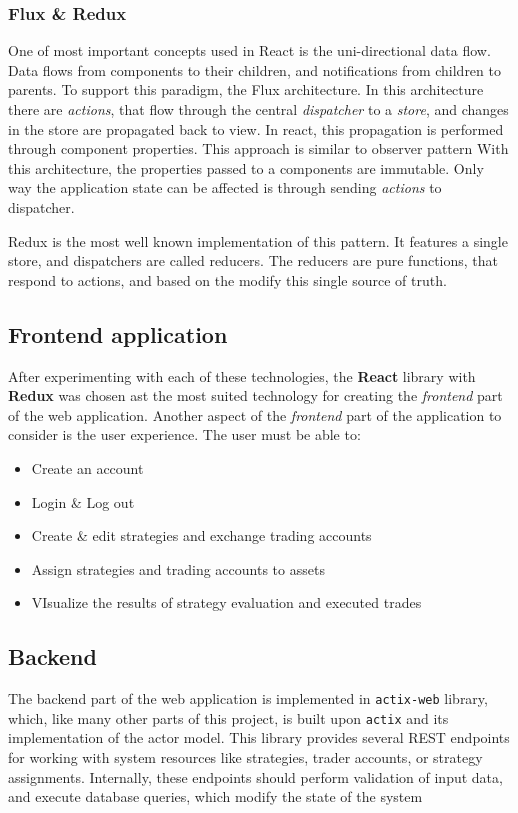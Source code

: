 \subsubsection{Flux \& Redux}
One of most important concepts used in React is the uni-directional data flow. Data flows
from components to their children, and notifications from children to parents.
To support this paradigm, the Flux architecture. In this architecture there are \textit{actions}, that flow through the
central \textit{dispatcher} to a \textit{store}, and changes in the store are propagated back to view. In react,
this propagation is performed through component properties. This approach is similar to observer pattern
With this architecture, the properties passed to a components are immutable. Only way the application state can be affected is
through sending \textit{actions} to dispatcher.

Redux is the most well known implementation of this pattern. It features a single store, and dispatchers are
called reducers. The reducers are pure functions, that respond to actions, and based on the modify this single source of truth.


\subsection{Frontend application}
After experimenting with each of these technologies, the \textbf{React} library with \textbf{Redux} was chosen ast the most suited technology for creating the \textit{frontend}
part of the web application.
Another aspect of the \textit{frontend} part of the application to consider is the user experience. The user
must be able to:
\begin{itemize}
    \item Create an account
    \item Login \& Log out
    \item Create \& edit strategies and exchange trading accounts
    \item Assign strategies and trading accounts to assets
    \item VIsualize the results of strategy evaluation and executed trades
\end{itemize}

\subsection{Backend}
The backend part of the web application is implemented in \verb|actix-web| library, which, like many other parts of this project,
is built upon \verb|actix| and its implementation of the actor model. This library provides several REST endpoints
for working with system resources like strategies, trader accounts, or strategy assignments. Internally,
these endpoints should perform validation of input data, and execute database queries, which modify the state of the system

